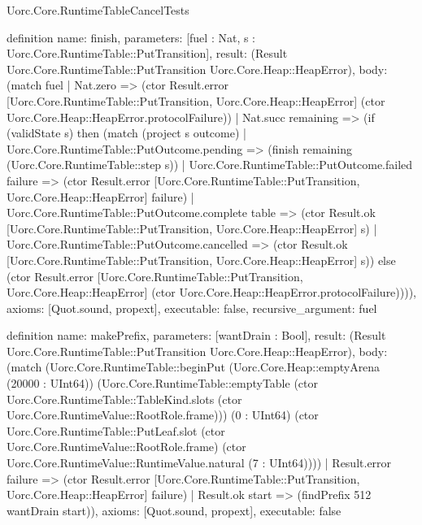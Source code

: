 \begin{lexlean}{Uorc.Core.RuntimeTableCancelTests}
\begin{semanticmodule}
definition{
  name: finish,
  parameters: [fuel : Nat, s : Uorc.Core.RuntimeTable::PutTransition],
  result: (Result Uorc.Core.RuntimeTable::PutTransition Uorc.Core.Heap::HeapError),
  body: (match fuel
    | Nat.zero => (ctor Result.error [Uorc.Core.RuntimeTable::PutTransition, Uorc.Core.Heap::HeapError] (ctor Uorc.Core.Heap::HeapError.protocolFailure))
    | Nat.succ remaining => (if (validState s) then (match (project s outcome)
      | Uorc.Core.RuntimeTable::PutOutcome.pending => (finish remaining (Uorc.Core.RuntimeTable::step s))
      | Uorc.Core.RuntimeTable::PutOutcome.failed failure => (ctor Result.error [Uorc.Core.RuntimeTable::PutTransition, Uorc.Core.Heap::HeapError] failure)
      | Uorc.Core.RuntimeTable::PutOutcome.complete table => (ctor Result.ok [Uorc.Core.RuntimeTable::PutTransition, Uorc.Core.Heap::HeapError] s)
      | Uorc.Core.RuntimeTable::PutOutcome.cancelled => (ctor Result.ok [Uorc.Core.RuntimeTable::PutTransition, Uorc.Core.Heap::HeapError] s)) else (ctor Result.error [Uorc.Core.RuntimeTable::PutTransition, Uorc.Core.Heap::HeapError] (ctor Uorc.Core.Heap::HeapError.protocolFailure)))),
  axioms: [Quot.sound, propext],
  executable: false,
  recursive_argument: fuel
}

definition{
  name: makePrefix,
  parameters: [wantDrain : Bool],
  result: (Result Uorc.Core.RuntimeTable::PutTransition Uorc.Core.Heap::HeapError),
  body: (match (Uorc.Core.RuntimeTable::beginPut (Uorc.Core.Heap::emptyArena (20000 : UInt64)) (Uorc.Core.RuntimeTable::emptyTable (ctor Uorc.Core.RuntimeTable::TableKind.slots (ctor Uorc.Core.RuntimeValue::RootRole.frame))) (0 : UInt64) (ctor Uorc.Core.RuntimeTable::PutLeaf.slot (ctor Uorc.Core.RuntimeValue::RootRole.frame) (ctor Uorc.Core.RuntimeValue::RuntimeValue.natural (7 : UInt64))))
    | Result.error failure => (ctor Result.error [Uorc.Core.RuntimeTable::PutTransition, Uorc.Core.Heap::HeapError] failure)
    | Result.ok start => (findPrefix 512 wantDrain start)),
  axioms: [Quot.sound, propext],
  executable: false
}


\end{semanticmodule}
\end{lexlean}
